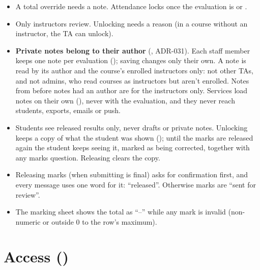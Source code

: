 \begin{itemize}
  \item A total override needs a note. Attendance locks once the evaluation is  or .
  \item Only instructors review. Unlocking needs a reason (in a course without an instructor, the TA can unlock).
  \item \textbf{Private notes belong to their author} (, ADR-031). Each staff member keeps one note per evaluation (); saving changes only their own. A note is read by its author and the course's enrolled instructors only: not other TAs, and not admins, who read courses as instructors but aren't enrolled. Notes from before notes had an author are for the instructors only. Services load notes on their own (), never with the evaluation, and they never reach students, exports, emails or push.
  \item Students see released results only, never drafts or private notes. Unlocking keeps a copy of what the student was shown (); until the marks are released again the student keeps seeing it, marked as being corrected, together with any marks question. Releasing clears the copy.
  \item Releasing marks (when submitting is final) asks for confirmation first, and every message uses one word for it: ``released''. Otherwise marks are ``sent for review''.
  \item The marking sheet shows the total as ``--'' while any mark is invalid (non-numeric or outside 0 to the row's maximum).
\end{itemize}

\section[Access]{Access ()}

